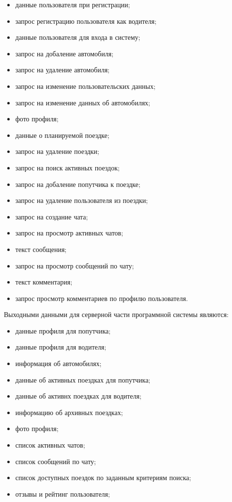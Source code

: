 \begin{itemize}
	\item данные пользователя при регистрации;
	\item запрос регистрацию пользователя как водителя;
	\item данные пользователя для входа в систему;
	\item запрос на добаление автомобиля;
	\item запрос на удаление автомобиля;
	\item запрос на изменение пользовательских данных;
	\item запрос на изменение данных об автомобилях;
	\item фото профиля;
	\item данные о планируемой поездке;
	\item запрос на удаление поездки;
	\item запрос на поиск активных поездок;
	\item запрос на добаление попутчика к поездке;
	\item запрос на удаление пользователя из поездки;
	\item запрос на создание чата;
	\item запрос на просмотр активных чатов;
	\item текст сообщения;
	\item запрос на просмотр сообщений по чату;
	\item текст комментария;
	\item запрос просмотр комментариев по профилю пользователя.
\end{itemize} 

Выходными данными для серверной части программной системы являются:

\begin{itemize}
	\item данные профиля для попутчика;
	\item данные профиля для водителя;
	\item информация об автомобилях;
	\item данные об активных поездках для попутчика;
	\item данные об активнх поездках для водителя;
	\item информацию об архивных поездках;
	\item фото профиля;
	\item список активных чатов;
	\item список сообщений по чату;
	\item список доступных поездок по заданным критериям поиска;
	\item отзывы и рейтинг пользователя;
\end{itemize}

